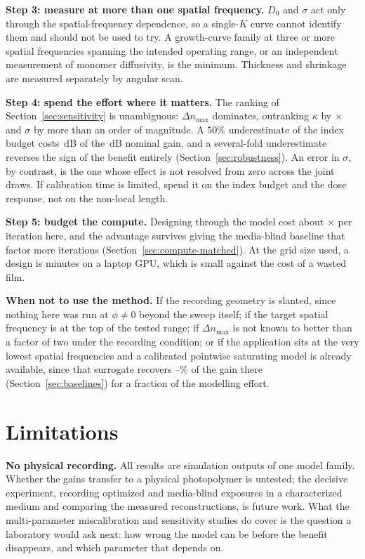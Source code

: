 \documentclass{optica-article}
\begin{document}
\textbf{Step 3: measure at more than one spatial frequency.} $D_0$ and
$\sigma$ act only through the spatial-frequency dependence, so a single-$K$
curve cannot identify them and should not be used to try. A growth-curve family
at three or more spatial frequencies spanning the intended operating range, or
an independent measurement of monomer diffusivity, is the minimum. Thickness
and shrinkage are measured separately by angular scan.

\textbf{Step 4: spend the effort where it matters.} The ranking of
Section~\ref{sec:sensitivity} is unambiguous: $\Delta n_{\max}$ dominates,
outranking $\kappa$ by \SensTopRangeRatio$\times$ and $\sigma$ by more than an
order of magnitude. A $50\%$ underestimate of the index budget costs
\SensRangeDnMax\,dB of the \SensNominalGain\,dB nominal gain, and a
several-fold underestimate reverses the sign of the benefit entirely
(Section~\ref{sec:robustness}). An error in $\sigma$, by contrast, is the one
whose effect is not resolved from zero across the joint draws. If calibration
time is limited, spend it on the index budget and the dose response, not on the
non-local length.

\textbf{Step 5: budget the compute.} Designing through the model cost about
\ComputeMatchRatio$\times$ per iteration here, and the advantage survives giving
the media-blind baseline that factor more iterations
(Section~\ref{sec:compute-matched}). At the grid size used, a design is minutes
on a laptop GPU, which is small against the cost of a wasted film.

\textbf{When not to use the method.} If the recording geometry is slanted,
since nothing here was run at $\phi\ne0$ beyond the sweep itself; if the target
spatial frequency is at the top of the tested range; if $\Delta n_{\max}$ is
not known to better than a factor of two under the recording condition; or if
the application sits at the very lowest spatial frequencies and a calibrated
pointwise saturating model is already available, since that surrogate recovers
\SATFracLowKMin--\SATFracLowKMax\% of the gain there
(Section~\ref{sec:baselines}) for a fraction of the modelling effort.

\section{Limitations}
\label{sec:discussion}
\textbf{No physical recording.} All results are simulation outputs of one model
family. Whether the gains transfer to a physical photopolymer is untested; the
decisive experiment, recording optimized and media-blind exposures in a
characterized medium and comparing the measured reconstructions, is future
work. What the multi-parameter miscalibration and sensitivity studies do cover
is the question a laboratory would ask next: how wrong the model can be before
the benefit disappears, and which parameter that depends on.
\end{document}
